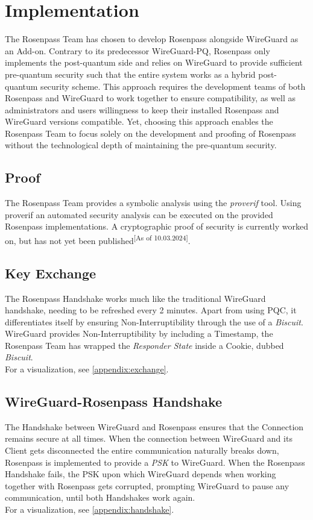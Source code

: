\documentclass[sigconf]{acmart}
\begin{document}
\section{Implementation}
The Rosenpass Team has chosen to develop Rosenpass alongside WireGuard as an Add-on. Contrary to its predecessor WireGuard-PQ, Rosenpass only implements the post-quantum side and relies on WireGuard to provide sufficient pre-quantum security such that the entire system works as a hybrid post-quantum security scheme. This approach requires the development teams of both Rosenpass and WireGuard to work together to ensure compatibility, as well as administrators and users willingness to keep their installed Rosenpass and WireGuard versions compatible. Yet, choosing this approach enables the Rosenpass Team to focus solely on the development and proofing of Rosenpass without the technological depth of maintaining the pre-quantum security.

\subsection{Proof}
The Rosenpass Team provides a symbolic analysis using the \textit{proverif} tool. Using proverif an automated security analysis can be executed on the provided Rosenpass implementations. A cryptographic proof of security is currently worked on, but has not yet been published\cite{rosenpass}\textsuperscript{[As of 10.03.2024]}.


\subsection{Key Exchange}
The Rosenpass Handshake works much like the traditional WireGuard handshake, needing to be refreshed every 2 minutes. Apart from using PQC, it differentiates itself by ensuring Non-Interruptibility through the use of a \textit{Biscuit}. WireGuard provides Non-Interruptibility by including a Timestamp, the Rosenpass Team has wrapped the \textit{Responder State} inside a Cookie, dubbed \textit{Biscuit}. \\
For a visualization, see \ref{appendix:exchange}.

\subsection{WireGuard-Rosenpass Handshake}
The Handshake between WireGuard and Rosenpass ensures that the Connection remains secure at all times. When the connection between WireGuard and its Client gets disconnected the entire communication naturally breaks down, Rosenpass is implemented to provide a \textit{PSK} to WireGuard. When the Rosenpass Handshake fails, the PSK upon which WireGuard depends when working together with Rosenpass gets corrupted, prompting WireGuard to pause any communication, until both Handshakes work again.\\
For a visualization, see \ref{appendix:handshake}.
\end{document}
